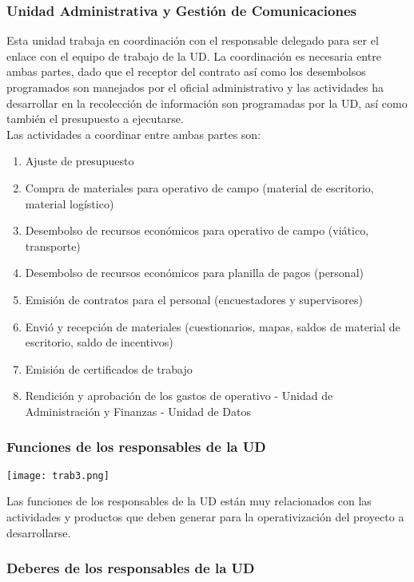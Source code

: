 \documentclass{article}
\begin{document}
\subsubsection{Unidad Administrativa y Gestión de Comunicaciones}

Esta unidad trabaja en coordinación con el responsable delegado para ser el enlace con el equipo de trabajo de la UD. La coordinación es necesaria entre ambas partes, dado que el receptor del contrato así como los desembolsos programados son manejados por el oficial administrativo y las actividades ha desarrollar en la recolección de información son programadas por la UD, así como también el presupuesto a ejecutarse.\\

Las actividades a coordinar entre ambas partes son:

\begin{enumerate}
\item Ajuste de presupuesto 
\item Compra de materiales para operativo de campo (material de escritorio, material logístico)
\item Desembolso de recursos económicos para operativo de campo (viático, transporte)
\item Desembolso de recursos económicos para planilla de pagos (personal)
\item Emisión de contratos para el personal (encuestadores y supervisores) 
\item Envió y recepción de materiales (cuestionarios, mapas, saldos de material de escritorio, saldo de incentivos)
\item Emisión de certificados de trabajo
\item Rendición y aprobación de los gastos de operativo - Unidad de Administración y Finanzas - Unidad de Datos
\end{enumerate}

\subsubsection{Funciones de los responsables de la UD}
\begin{center}
\texttt{[image: trab3.png]}
\end{center}

Las funciones de los responsables de la UD están muy relacionados con las actividades y productos que deben generar para la operativización del proyecto a desarrollarse. 

\subsubsection{Deberes de los responsables de la UD}
\end{document}
